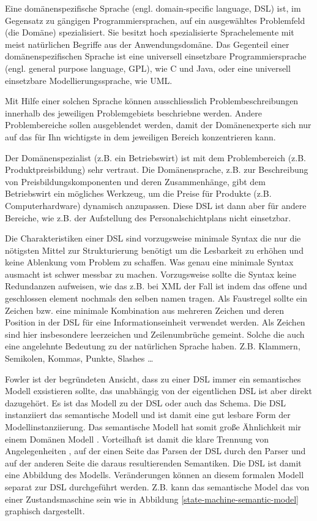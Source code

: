 \documentclass[11pt,english,ngerman, headsepline]{scrreprt}
\begin{document}
Eine domänenspezifische Sprache (engl. domain-specific language, DSL) ist, im
Gegensatz zu gängigen Programmiersprachen, auf ein ausgewähltes
 Problemfeld (die Domäne) spezialisiert. Sie besitzt hoch spezialisierte
Sprachelemente mit meist natürlichen Begriffe aus der Anwendungsdomäne.
Das Gegenteil einer domänenspezifischen Sprache ist eine universell einsetzbare
Programmiersprache (engl. general purpose language, GPL), wie C und Java, oder
eine universell einsetzbare Modellierungssprache, wie UML.

Mit Hilfe einer solchen Sprache können ausschliesslich Problembeschreibungen
innerhalb des jeweiligen Problemgebiets beschriebne werden.
Andere Problembereiche sollen ausgeblendet werden, damit der Domänenexperte sich
nur auf das für Ihn wichtigste in dem jeweiligen Bereich konzentrieren kann.

Der Domänenspezialist (z.B. ein Betriebswirt) ist mit dem Problembereich (z.B.
Produktpreisbildung) sehr vertraut. Die Domänensprache, z.B. zur Beschreibung
von Preisbildungskomponenten und deren Zusammenhänge, gibt dem Betriebswirt ein
mögliches Werkzeug, um die Preise für Produkte (z.B. Computerhardware) dynamisch
anzupassen. Diese DSL ist dann aber für andere Bereiche, wie z.B.
der Aufstellung des Personalschichtplans nicht einsetzbar.

Die Charakteristiken einer DSL sind vorzugsweise minimale Syntax die nur die
nötigsten Mittel zur Strukturierung benötigt um die Lesbarkeit zu erhöhen und
keine Ablenkung vom Problem zu schaffen. 
Was genau eine minimale Syntax ausmacht ist schwer messbar zu machen.
Vorzugsweise sollte die Syntax keine Redundanzen aufweisen, wie das z.B. bei
XML der Fall ist indem das offene und geschlossen element nochmals den selben
namen tragen. Als Faustregel sollte ein Zeichen bzw. eine minimale Kombination
aus mehreren Zeichen und deren Position in der DSL für eine Informationseinheit
verwendet werden. Als Zeichen sind hier insbesondere leerzeichen und
Zeilenumbrüche gemeint. Solche die auch eine angelehnte Bedeutung zu der
natürlichen Sprache haben. Z.B. Klammern, Semikolen, Kommas, Punkte, Slashes \ldots 

Fowler ist der begründeten Ansicht, dass zu einer DSL immer ein semantisches
Modell \cite[p. 159]{fowler2011domain} exsistieren sollte, das unabhängig von
der eigentlichen DSL ist aber direkt dazugehört. Es ist das Modell zu der DSL 
oder auch das Schema. Die DSL instanziiert das semantische Modell und ist damit
eine gut lesbare Form der Modellinstanziierung. Das semantische Modell hat somit
große Ähnlichkeit mir einem Domänen Modell \cite[]{fowler2003patterns}.
Vorteilhaft ist damit die klare Trennung von Angelegenheiten
\cite{Hürsch95separationof}, auf der einen Seite das Parsen der DSL durch den
Parser und auf der anderen Seite die daraus resultierenden Semantiken.
Die DSL ist damit eine Abbildung des Modells. Veränderungen können an diesem
formalen Modell separat zur DSL durchgeführt werden. Z.B. kann das semantische
Model das von einer Zustandsmaschine sein wie in Abbildung
\ref{state-machine-semantic-model} graphisch dargestellt.
\end{document}
